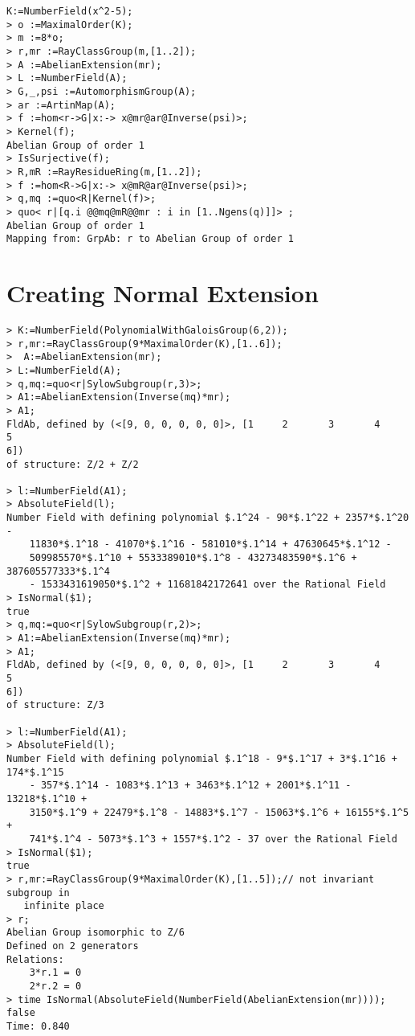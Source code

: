 \documentclass{article}
\theoremstyle{break}
\begin{document}
\begin{lstlisting}
K:=NumberField(x^2-5);
> o :=MaximalOrder(K);
> m :=8*o;                
> r,mr :=RayClassGroup(m,[1..2]);
> A :=AbelianExtension(mr);
> L :=NumberField(A);
> G,_,psi :=AutomorphismGroup(A);
> ar :=ArtinMap(A);
> f :=hom<r->G|x:-> x@mr@ar@Inverse(psi)>;
> Kernel(f);
Abelian Group of order 1
> IsSurjective(f);
> R,mR :=RayResidueRing(m,[1..2]);              
> f :=hom<R->G|x:-> x@mR@ar@Inverse(psi)>;
> q,mq :=quo<R|Kernel(f)>;   
> quo< r|[q.i @@mq@mR@@mr : i in [1..Ngens(q)]]> ;
Abelian Group of order 1
Mapping from: GrpAb: r to Abelian Group of order 1
\end{lstlisting}



\section{Creating Normal Extension}

\begin{lstlisting}
> K:=NumberField(PolynomialWithGaloisGroup(6,2));
> r,mr:=RayClassGroup(9*MaximalOrder(K),[1..6]);
>  A:=AbelianExtension(mr);                      
> L:=NumberField(A);
> q,mq:=quo<r|SylowSubgroup(r,3)>;                 
> A1:=AbelianExtension(Inverse(mq)*mr);
> A1;
FldAb, defined by (<[9, 0, 0, 0, 0, 0]>, [1     2       3       4       5       
6])
of structure: Z/2 + Z/2

> l:=NumberField(A1);
> AbsoluteField(l);
Number Field with defining polynomial $.1^24 - 90*$.1^22 + 2357*$.1^20 - 
    11830*$.1^18 - 41070*$.1^16 - 581010*$.1^14 + 47630645*$.1^12 - 
    509985570*$.1^10 + 5533389010*$.1^8 - 43273483590*$.1^6 + 387605577333*$.1^4
    - 1533431619050*$.1^2 + 11681842172641 over the Rational Field
> IsNormal($1);
true
> q,mq:=quo<r|SylowSubgroup(r,2)>;
> A1:=AbelianExtension(Inverse(mq)*mr);
> A1;                                            
FldAb, defined by (<[9, 0, 0, 0, 0, 0]>, [1     2       3       4       5       
6])
of structure: Z/3

> l:=NumberField(A1);
> AbsoluteField(l);
Number Field with defining polynomial $.1^18 - 9*$.1^17 + 3*$.1^16 + 174*$.1^15 
    - 357*$.1^14 - 1083*$.1^13 + 3463*$.1^12 + 2001*$.1^11 - 13218*$.1^10 + 
    3150*$.1^9 + 22479*$.1^8 - 14883*$.1^7 - 15063*$.1^6 + 16155*$.1^5 + 
    741*$.1^4 - 5073*$.1^3 + 1557*$.1^2 - 37 over the Rational Field
> IsNormal($1);
true
> r,mr:=RayClassGroup(9*MaximalOrder(K),[1..5]);// not invariant subgroup in
   infinite place
> r;
Abelian Group isomorphic to Z/6
Defined on 2 generators
Relations:
    3*r.1 = 0
    2*r.2 = 0
> time IsNormal(AbsoluteField(NumberField(AbelianExtension(mr))));             
false
Time: 0.840





\end{lstlisting}
\end{document}
